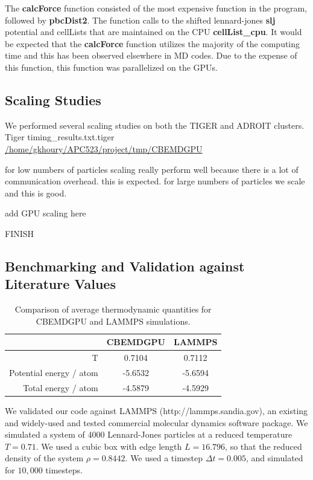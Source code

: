 \documentclass[12pt]{article}
\begin{document}
The \textbf{calcForce} function consisted of the most expensive function in the program, followed by \textbf{pbcDist2}. The function calls to the shifted lennard-jones \textbf{slj} potential and cellLists that are maintained on the CPU \textbf{cellList\_cpu}. It would be expected that the \textbf{calcForce} function utilizes the majority of the computing time and this has been observed elsewhere in MD codes. Due to the expense of this function, this function was parallelized on the GPUs.

\subsection{Scaling Studies}
\label{sec:scalingstudies}

We performed several scaling studies on both the TIGER and ADROIT clusters.
Tiger timing\_results.txt.tiger
\url{/home/gkhoury/APC523/project/tmp/CBEMDGPU}

for low numbers of particles scaling really  perform well because there is a lot of communication overhead.
this is expected.
for large numbers of particles we scale and this is good.

add GPU scaling here


FINISH


\subsection{Benchmarking and Validation against Literature Values}

\begin{table}[H]
\begin{centering}
	\begin{tabular}{| r | c | c |}
		\hline
		 & CBEMDGPU & LAMMPS \\
		 \hline
		 T & 0.7104 & 0.7112 \\
		 \hline
		 Potential energy / atom & -5.6532 & -5.6594 \\
		 \hline
		 Total energy / atom & -4.5879 & -4.5929 \\
		 \hline
	\end{tabular}
	\caption{Comparison of average thermodynamic quantities for CBEMDGPU and LAMMPS simulations.}
	\label{table:lmp_compare}
\end{centering}
\end{table}

We validated our code against LAMMPS \cite{Plimpton1995} (http://lammps.sandia.gov), an existing and widely-used and tested commercial molecular dynamics software package.
%
We simulated a system of 4000 Lennard-Jones particles at a reduced temperature $T=0.71$.
%
We used a cubic box with edge length $L=16.796$, so that the reduced density of the system $\rho = 0.8442$.
%
We used a timestep $\Delta t=0.005$, and simulated for $10,000$ timesteps.
\end{document}
